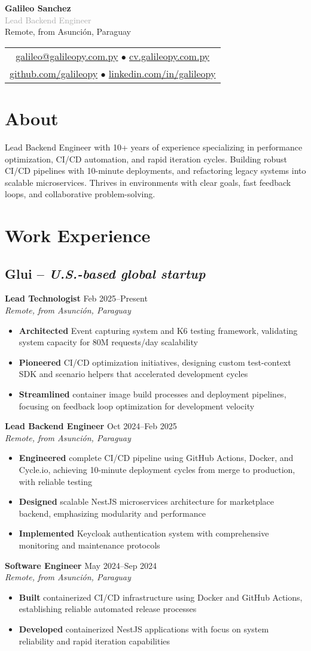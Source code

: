 \documentclass[11pt,a4paper]{article}
\newcommand{\actionverb}[1]{\textcolor{actioncolor}{\textbf{#1}}}
\newcommand{\cvheader}[5]{
  \begin{center}
    {\Huge \textbf{#1}}\\[0.4em]
    {\Large \textcolor{darkgray}{#2}}\\[1em]
    
    \textcolor{mediumgray}{#3}\\[0.6em]
    
    \begin{tabular}{c}
      \href{mailto:#4}{#4} $\bullet$ \href{https://#5}{#5}\\[0.3em]
      \href{https://github.com/galileopy}{github.com/galileopy} $\bullet$ 
      \href{https://www.linkedin.com/in/galileopy}{linkedin.com/in/galileopy}
    \end{tabular}
  \end{center}
  \vspace{1.2em}
}
\newcommand{\cvcompany}[3]{
  \subsection{#1 \textcolor{mediumgray}{#2}}
  #3
  \vspace{0.5em}
}
\newcommand{\cvrole}[4]{
  \textbf{#1} \hfill \textcolor{mediumgray}{\small #2}\\
  \textit{#3}
  \begin{itemize}
    #4
  \end{itemize}
  \vspace{1em}
}
\begin{document}
\cvheader{Galileo Sanchez}{Lead Backend Engineer}{Remote, from Asunción, Paraguay}{galileo@galileopy.com.py}{cv.galileopy.com.py}

\section{About}
Lead Backend Engineer with 10+ years of experience specializing in performance optimization, CI/CD automation, and rapid iteration cycles. Building robust CI/CD pipelines with 10-minute deployments, and refactoring legacy systems into scalable microservices. Thrives in environments with clear goals, fast feedback loops, and collaborative problem-solving.

\section{Work Experience}

\cvcompany{Glui}{-- \textit{U.S.-based global startup}}{
  \cvrole{Lead Technologist}{Feb 2025--Present}{Remote, from Asunción, Paraguay}{
    \item \actionverb{Architected} Event capturing system and K6 testing framework, validating system capacity for 80M requests/day scalability
    \item \actionverb{Pioneered} CI/CD optimization initiatives, designing custom test-context SDK and scenario helpers that accelerated development cycles
    \item \actionverb{Streamlined} container image build processes and deployment pipelines, focusing on feedback loop optimization for development velocity
  }
  
  \cvrole{Lead Backend Engineer}{Oct 2024--Feb 2025}{Remote, from Asunción, Paraguay}{
    \item \actionverb{Engineered} complete CI/CD pipeline using GitHub Actions, Docker, and Cycle.io, achieving 10-minute deployment cycles from merge to production, with reliable testing
    \item \actionverb{Designed} scalable NestJS microservices architecture for marketplace backend, emphasizing modularity and performance
    \item \actionverb{Implemented} Keycloak authentication system with comprehensive monitoring and maintenance protocols
  }
  
  \cvrole{Software Engineer}{May 2024--Sep 2024}{Remote, from Asunción, Paraguay}{
    \item \actionverb{Built} containerized CI/CD infrastructure using Docker and GitHub Actions, establishing reliable automated release processes
    \item \actionverb{Developed} containerized NestJS applications with focus on system reliability and rapid iteration capabilities
  }
}
\end{document}
